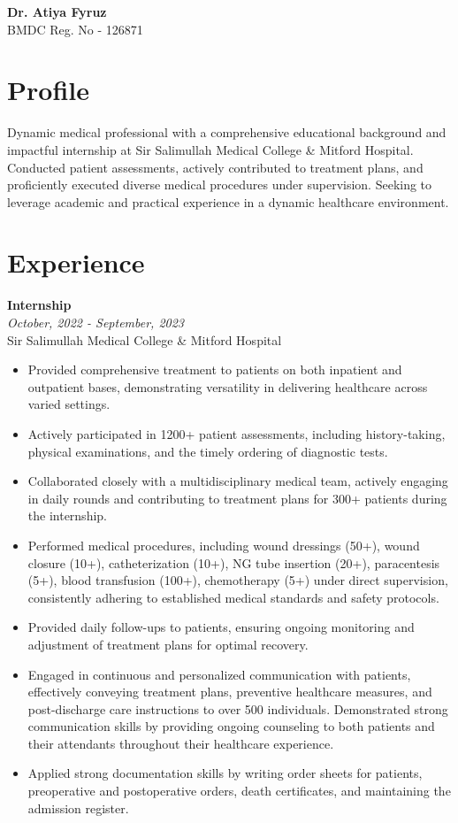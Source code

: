 \documentclass[a4paper,12pt]{article}
\newcommand{\resumeentry}[2]{
    \textbf{#1} \\
    \textit{#2}
}
\begin{document}
\begin{minipage}[t][2.4cm]{\textwidth}
    \raggedright
    {\Huge\bfseries\color{black}Dr. Atiya Fyruz} \\
    \large{BMDC Reg. No - 126871}
\end{minipage}
\begin{minipage}[t][17cm]{\textwidth}
  \section*{Profile}
	Dynamic medical professional with a comprehensive educational background and impactful internship at Sir Salimullah Medical College \& Mitford Hospital. 
	Conducted patient assessments, actively contributed to treatment plans, and proficiently executed diverse medical procedures under supervision. 
	Seeking to leverage academic and practical experience in a dynamic healthcare environment.
	\\
\section*{Experience}
	\resumeentry{Internship}{October, 2022 - September, 2023}\\ Sir Salimullah Medical College \& Mitford Hospital \vspace{0.2cm}
\begin{itemize}[left=0em, topsep=0pt, itemsep=4pt, parsep=0pt]
	\item Provided comprehensive treatment to patients on both inpatient and outpatient bases, demonstrating versatility in delivering healthcare across varied settings.
	\item Actively participated in 1200+ patient assessments, including history-taking, physical examinations, and the timely ordering of diagnostic tests.
  \item Collaborated closely with a multidisciplinary medical team, actively engaging in daily rounds and contributing to treatment plans for 300+ patients during the internship.
  \item Performed medical procedures, including wound dressings (50+), wound closure (10+), catheterization (10+), NG tube insertion (20+), paracentesis (5+), blood transfusion (100+), chemotherapy (5+) under direct supervision, consistently adhering to established medical standards and safety protocols.
	\item Provided daily follow-ups to patients, ensuring ongoing monitoring and adjustment of treatment plans for optimal recovery.
	\item Engaged in continuous and personalized communication with patients, effectively conveying treatment plans, preventive healthcare measures, and post-discharge care instructions to over 500 individuals. Demonstrated strong communication skills by providing ongoing counseling to both patients and their attendants throughout their healthcare experience.
	\item Applied strong documentation skills by writing order sheets for patients, preoperative and postoperative orders, death certificates, and maintaining the admission register.
\end{itemize}
\end{minipage}
\end{document}
